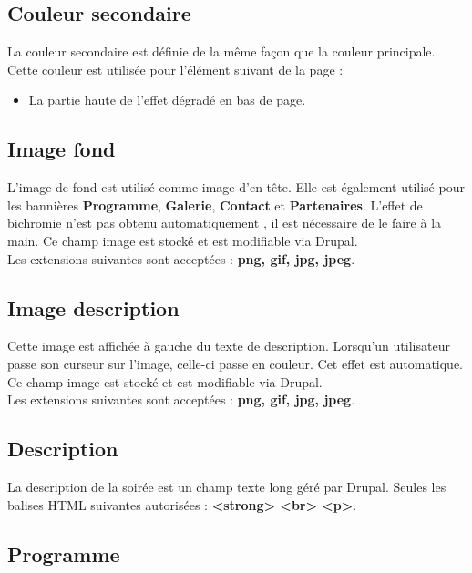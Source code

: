 \documentclass[11pt]{report}
\begin{document}
\subsection{Couleur secondaire}

La couleur secondaire est définie de la même façon que la couleur principale.
Cette couleur est utilisée pour l'élément suivant de la page :
\begin{itemize}
	\item La partie haute de l'effet dégradé en bas de page.
\end{itemize}

\subsection{Image fond}

L'image de fond est utilisé comme image d'en-tête. Elle est également utilisé
pour les bannières \textbf{Programme}, \textbf{Galerie}, \textbf{Contact} et
\textbf{Partenaires}. L'effet de bichromie n'est pas obtenu automatiquement , il
est nécessaire de le faire à la main.
Ce champ image est stocké et est modifiable via Drupal. \\
Les extensions suivantes sont acceptées : \textbf{png, gif, jpg, jpeg}.

\subsection{Image description}

Cette image est affichée à gauche du texte de description. Lorsqu'un utilisateur
passe son curseur sur l'image, celle-ci passe en couleur. Cet effet est automatique.
Ce champ image est stocké et est modifiable via Drupal. \\
Les extensions suivantes sont acceptées : \textbf{png, gif, jpg, jpeg}.

\subsection{Description}

La description de la soirée est un champ texte long géré par Drupal.
Seules les balises HTML suivantes autorisées : \textbf{<strong> <br> <p>}.

\subsection{Programme}
\end{document}
